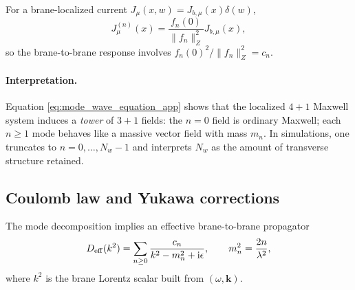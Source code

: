 \documentclass[11pt]{article}
\newcommand{\Z}{Z}              %
\begin{document}
For a brane-localized current \(J_\mu(x,w)=J_{b,\mu}(x)\delta(w)\),
\begin{equation}
J_{\mu}^{(n)}(x)=\frac{f_n(0)}{\|f_n\|_{\Z}^2}J_{b,\mu}(x),
\label{eq:mode_source_brane_local_app}
\end{equation}
so the brane-to-brane response involves \(f_n(0)^2/\|f_n\|_{\Z}^2=c_n\).

\paragraph{Interpretation.}
Equation \eqref{eq:mode_wave_equation_app} shows that the localized \(4+1\) Maxwell system
induces a \emph{tower} of \(3+1\) fields:
the \(n=0\) field is ordinary Maxwell;
each \(n\ge 1\) mode behaves like a massive vector field with mass \(m_n\).
In simulations, one truncates to \(n=0,\ldots,N_w-1\) and interprets \(N_w\) as the
amount of transverse structure retained.

\subsection{Coulomb law and Yukawa corrections}
\label{app:yukawa_corrections}

The mode decomposition implies an effective brane-to-brane propagator
\begin{equation}
D_{\rm eff}(k^2)
=
\sum_{n\ge 0}\frac{c_n}{k^2-m_n^2+\mathrm{i}\epsilon},
\qquad
m_n^2=\frac{2n}{\lambda^2},
\label{eq:Deff_app}
\end{equation}
where \(k^2\) is the brane Lorentz scalar built from \((\omega,\mathbf{k})\).
\end{document}
